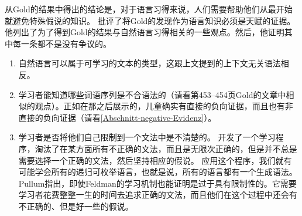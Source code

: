 从Gold的结果中得出的结论是，对于语言习得来说，人们需要帮助他们从最开始就避免特殊假说的知识。 批评了将Gold的发现作为语言知识必须是天赋的证据。他列出了为了得到Gold的结果与自然语言习得相关的一些观点。然后，他证明其中每一条都不是没有争议的。

\begin{enumerate}
\item 自然语言可以属于可学习的文本的类型，这跟上文提到的上下文无关语法相反。

\item 学习者能知道哪些词语序列是不合语法的（请看第453--454页Gold的文章中相似的观点）。正如在那之后展示的，儿童确实有直接的负向证据，而且也有非直接的负向证据（请看\ref{Abschnitt-negative-Evidenz}）。

\item 学习者是否将他们自己限制到一个文法中是不清楚的。 \citet{Feldman72a}开发了一个学习程序，淘汰了在某方面所有不正确的文法，而且是无限次正确的，但是并不总是需要选择一个正确的文法，然后坚持相应的假说。
  应用这个程序，我们就有可能学会所有的递归可枚举语言，也就是说，所有的语言都有一个生成语法。Pullum指出，即使Feldman的学习机制也能证明是过于具有限制性的。它需要学习者花费整整一生的时间去追求正确的文法，而且他们在这个过程中还会有不正确的、但是好一些的假说。


\end{enumerate}
